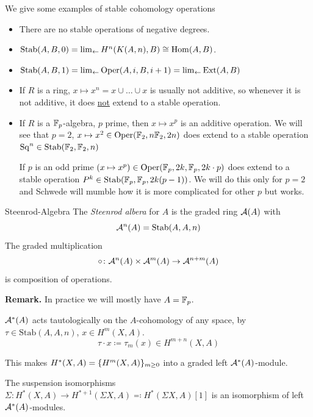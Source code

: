 \documentclass[language=english]{TemplateLecture}
\begin{document}
We give some examples of stable cohomology operations

\begin{example}\leavevmode
    \begin{itemize}
        \item There are no stable operations of negative degrees.

        \item \(\mathrm{Stab}(A,B,0) = \lim_{\leftarrow} H^n(K(A,n),B) \cong \operatorname{Hom}(A,B)\).
        \item \(\mathrm{Stab}(A,B,1) = \lim_{\leftarrow} \mathrm{Oper}(A,i,B,i+1) = \lim_{\leftarrow} \mathrm{Ext}(A,B)\)
        \item If \(R\) is a ring, \(x\mapsto x^n = x\cup \dots \cup x\) is usually not additive, so whenever it is not additive, it does \underline{not} extend to a stable operation.
        \item If \(R\) is a \(\mathbb{F}_p\)-algebra, \(p\) prime, then \(x\mapsto x^p\) is an additive operation. We will see that \(p = 2\), \(x\mapsto x^2\in \mathrm{Oper}(\mathbb{F}_2, n\mathbb{F}_2, 2n)\) does extend to a stable operation \(\mathrm{Sq}^n\in \mathrm{Stab}(\mathbb{F}_2, \mathbb{F}_2, n)\)
        
        If \(p\) is an odd prime \((x\mapsto x^p)\in \mathrm{Oper}(\mathbb{F}_p, 2k, \mathbb{F}_p, 2k\cdot p)\) does extend to a stable operation \(P^k \in \mathrm{Stab}(\mathbb{F}_p, \mathbb{F}_p, 2k(p-1))\). We will do this only for \(p=2\) and Schwede will mumble how it is more complicated for other \(p\) but works.
    \end{itemize}
\end{example}


\begin{defi}{Steenrod-Algebra}{}
    The \emph{Steenrod albera} for \(A\) is the graded ring \(\mathcal{A}(A)\) with
    \[\mathcal{A}^n(A) = \mathrm{Stab}(A,A,n)\]
    The graded multiplication
    \[\circ\colon \mathcal{A}^n(A)\times \mathcal{A}^m(A) \to \mathcal{A}^{n+m}(A)\]
    is composition of operations.
\end{defi}

\textbf{Remark.} In practice we will mostly have \(A = \mathbb{F}_p\).

\(\mathcal{A}^*(A)\) acts tautologically on the \(A\)-cohomology of any space, by \(\tau\in \mathrm{Stab}(A,A,n)\), \(x\in H^m(X,A)\).
\[\tau\cdot x\coloneq \tau_m(x)\in H^{m+n}(X,A)\]

This makes \(H^*(X,A) = \{H^m(X,A)\}_{m\geq 0}\) into a graded left \(\mathcal{A}^*(A)\)-module.

The suspension isomorphisms \(\Sigma\colon H^*(X,A)\to H^{*+1}(\Sigma X, A) \eqcolon H^*(\Sigma X, A)[1]\) is an isomorphism of left \(\mathcal{A}^*(A)\)-modules.
\end{document}

